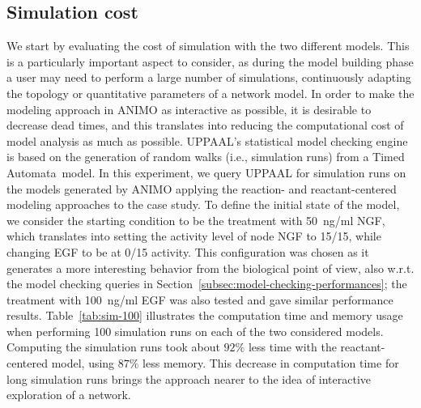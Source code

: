 \documentclass{llncs}
\newcommand{\tas}{Timed Automata}
\begin{document}
\subsection{Simulation cost}
We start by evaluating the cost of simulation with the two different models. This is a particularly
important aspect to consider, as during the model building phase a user may need to perform a large number of simulations,
continuously adapting the topology or quantitative parameters of a network model. In order to make
the modeling approach in ANIMO as interactive as possible, it is desirable to decrease dead times,
and this translates into reducing the computational cost of model analysis as much as possible.
UPPAAL's statistical model checking engine~\cite{uppaal-smc} is based on the generation of random walks (i.e., simulation runs) from a \tas\ model.
In this experiment, we query UPPAAL for simulation runs on the models
generated by ANIMO applying the reaction- and reactant-centered modeling approaches to the case study.
To define the initial state of the model, we consider the starting condition to be the treatment with 50~ng/ml NGF, which translates into
setting the activity level of node NGF to 15/15, while changing EGF to be at 0/15 activity.
This configuration was chosen as it generates a more interesting behavior from the biological point of view,
also w.r.t. the model checking queries in Section~\ref{subsec:model-checking-performances};
the treatment with 100~ng/ml EGF was also tested and gave similar performance results.
Table~\ref{tab:sim-100} illustrates the computation time and memory usage when performing 100 simulation runs on each of the
two considered models. Computing the simulation runs took about $92 \%$ less time with the reactant-centered model, using $87 \%$
less memory. This decrease in computation time for long simulation runs brings the approach nearer to the idea
of interactive exploration of a network.
\end{document}
